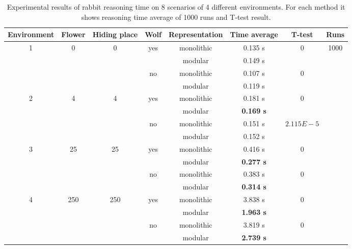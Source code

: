 \documentclass{aamas2012}
\begin{document}
	\begin{table}
		\label{experiment_results}
		\centering
		\begin{tabular}{ | c | c | c | c | c | c | c | c | }
		\hline
		Environment & Flower & Hiding place & Wolf & Representation & Time average & T-test & Runs\\	
		\hline
	 	\multirow{4}{*}{1} & \multirow{4}{*}{0} & \multirow{4}{*}{0} & \multirow{2}{*}{yes} & monolithic & 0.135 s & \multirow{2}{*}{0} & \multirow{16}{*}{1000} \\
		& & & & modular & 0.149 s & & \\ \cline{4-7}
		& & & \multirow{2}{*}{no} & monolithic & 0.107 s & \multirow{2}{*}{0} & \\
		& & & & modular & 0.119 s & & \\ \cline{1-7}
		\multirow{4}{*}{2} & \multirow{4}{*}{4} & \multirow{4}{*}{4} & \multirow{2}{*}{yes} & monolithic & 0.181 s & \multirow{2}{*}{0} & \\
		& & & & modular & \textbf{0.169 s} & & \\ \cline{4-7}
		& & & \multirow{2}{*}{no} & monolithic & 0.151 s & \multirow{2}{*}{$2.115E-5$} & \\
		& & & & modular & 0.152 s & & \\ \cline{1-7}
		\multirow{4}{*}{3} & \multirow{4}{*}{25} & \multirow{4}{*}{25} & \multirow{2}{*}{yes} & monolithic & 0.416 s & \multirow{2}{*}{0} & \\
		& & & & modular & \textbf{0.277 s} & & \\ \cline{4-7}
		& & & \multirow{2}{*}{no} & monolithic & 0.383 s & \multirow{2}{*}{0} & \\
		& & & & modular & \textbf{0.314 s} & & \\ \cline{1-7}
		\multirow{4}{*}{4} & \multirow{4}{*}{250} & \multirow{4}{*}{250} & \multirow{2}{*}{yes} & monolithic & 3.838 s & \multirow{2}{*}{0} & \\
		& & & & modular & \textbf{1.963 s} & & \\ \cline{4-7}
		& & &  \multirow{2}{*}{no} & monolithic & 3.819 s & \multirow{2}{*}{0} & \\
		& & & & modular & \textbf{2.739 s} & & \\ \cline{1-7}
		\hline
		\end{tabular}
		\caption
		{
			Experimental results of rabbit reasoning time on 8 scenarios of 4 different environments.
			For each method it shows reasoning time average of 1000 runs and T-test result.
		}
	\end{table}
\end{document}
